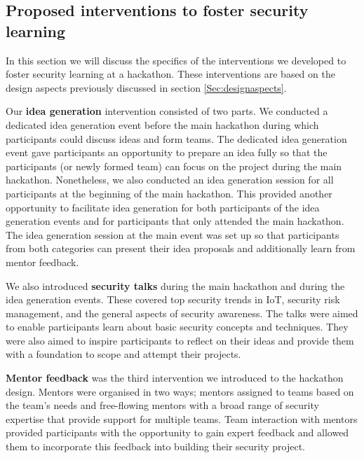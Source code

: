 \documentclass[runningheads]{llncs}
\begin{document}
\subsection{Proposed interventions to foster security learning} \label{Sec:interventions}
In this section we will discuss the specifics of the interventions we developed to foster security learning at a hackathon. These interventions are based on the design aspects previously discussed in section \ref{Sec:designaspects}.

Our \textbf{idea generation} intervention consisted of two parts. We conducted a dedicated idea generation event before the main hackathon during which participants could discuss ideas and form teams. The dedicated idea generation event gave participants an opportunity to prepare an idea fully so that the participants (or newly formed team) can focus on the project during the main hackathon. Nonetheless, we also conducted an idea generation session for all participants at the beginning of the main hackathon. This provided another opportunity to facilitate idea generation for both participants of the idea generation events and for participants that only attended the main hackathon. The idea generation session at the main event was set up so that participants from both categories can present their idea proposals and additionally learn from mentor feedback.

We also introduced \textbf{security talks} during the main hackathon and during the idea generation events. These covered top security trends in IoT, security risk management, and the general aspects of security awareness. The talks were aimed to enable participants learn about basic security concepts and techniques. They were also aimed to inspire participants to reflect on their ideas and provide them with a foundation to scope and attempt their projects.

\textbf{Mentor feedback} was the third intervention we introduced to the hackathon design. Mentors were organised in two ways; mentors assigned to teams based on the team's needs and free-flowing mentors with a broad range of security expertise that provide support for multiple teams. Team interaction with mentors provided participants with the opportunity to gain expert feedback and allowed them to incorporate this feedback into building their security project. 
 
\end{document}
